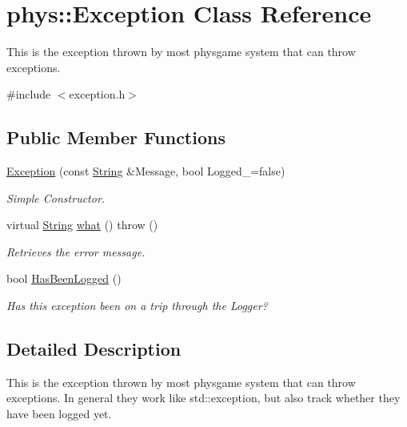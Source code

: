\hypertarget{classphys_1_1Exception}{
\section{phys::Exception Class Reference}
\label{dc/d47/classphys_1_1Exception}
}


This is the exception thrown by most physgame system that can throw exceptions.  




{\ttfamily \#include $<$exception.h$>$}

\subsection*{Public Member Functions}
\begin{DoxyCompactItemize}
\item 
\hyperlink{classphys_1_1Exception_a73fd1d2603e30f5663fef2d64df5179f}{Exception} (const \hyperlink{namespacephys_aa03900411993de7fbfec4789bc1d392e}{String} \&Message, bool Logged\_\-=false)
\begin{DoxyCompactList}\small\item\em Simple Constructor. \item\end{DoxyCompactList}\item 
virtual \hyperlink{namespacephys_aa03900411993de7fbfec4789bc1d392e}{String} \hyperlink{classphys_1_1Exception_ac929f9b3929526eec6e6b581c9a9dd73}{what} ()  throw ()
\begin{DoxyCompactList}\small\item\em Retrieves the error message. \item\end{DoxyCompactList}\item 
bool \hyperlink{classphys_1_1Exception_ab1399e25435c390db551855fda338951}{HasBeenLogged} ()
\begin{DoxyCompactList}\small\item\em Has this exception been on a trip through the Logger? \item\end{DoxyCompactList}\end{DoxyCompactItemize}


\subsection{Detailed Description}
This is the exception thrown by most physgame system that can throw exceptions. In general they work like std::exception, but also track whether they have been logged yet. 

